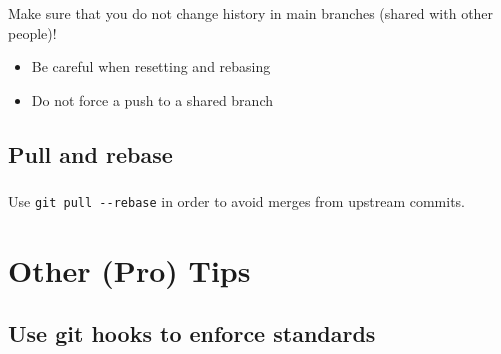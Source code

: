 
\begin{frame}
  \frametitle{\insertsubsection}

  Make sure that you do not change history in main branches (shared with other people)!

  \begin{itemize}
    \item Be careful when resetting and rebasing
    \item Do not force a push to a shared branch
  \end{itemize}

\end{frame}


\subsection{Pull and rebase}

\begin{frame}
  \begin{center}
    \textbf{\Huge{\insertsubsection}}
  \end{center}
\end{frame}


\begin{frame}
  \frametitle{\insertsubsection}

  Use \texttt{git pull -{}-rebase} in order to avoid merges from upstream commits.

\end{frame}


\section{Other (Pro) Tips}

\begin{frame}[plain]

  \begin{center}
    \textbf{\Huge{\insertsection}}
  \end{center}

\end{frame}


\subsection{Use git hooks to enforce standards}

